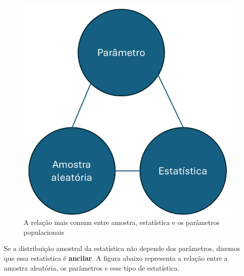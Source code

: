 \documentclass[
  letterpaper,
  DIV=11,
  numbers=noendperiod]{scrartcl}
\begin{document}
\begin{figure}

{\centering \includegraphics{fig_stat_geral.jpg}

}

\caption{A relação mais comum entre amostra, estatística e os parâmetros
populacionais}

\end{figure}%

Se a distribuição amostral da estatística não depende dos parâmetros,
dizemos que essa estatística é \textbf{ancilar}. A figura abaixo
representa a relação entre a amostra aleatória, os parâmetros e esse
tipo de estatística.
\end{document}
